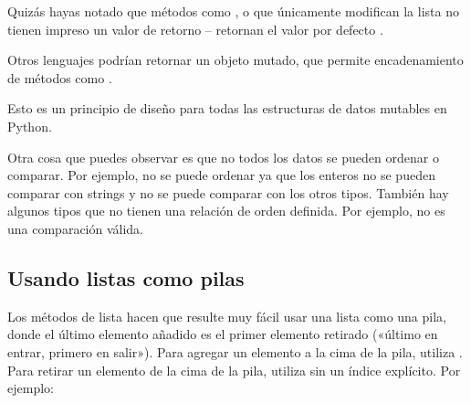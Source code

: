 \documentclass[a5paper,10pt,spanish]{sphinxmanual}
\begin{document}
\sphinxAtStartPar
Quizás hayas notado que métodos como ,  o  que únicamente modifican la lista no tienen impreso un valor de retorno – retornan el valor por defecto . \sphinxstepexplicit %
\begin{footnote}[1]\label{\thesphinxscope.1}%
\sphinxAtStartFootnote
Otros lenguajes podrían retornar un objeto mutado, que permite encadenamiento de métodos como .
%
\end{footnote} Esto es un principio de diseño para todas las estructuras de datos mutables en Python.

\sphinxAtStartPar
Otra cosa que puedes observar es que no todos los datos se pueden ordenar o comparar. Por ejemplo,  no se puede ordenar ya que los enteros no se pueden comparar con strings y  no se puede comparar con los otros tipos. También hay algunos tipos que no tienen una relación de orden definida. Por ejemplo,  no es una comparación válida.


\subsection{Usando listas como pilas}
\label{\detokenize{tutorial/datastructures:using-lists-as-stacks}}\label{\detokenize{tutorial/datastructures:tut-lists-as-stacks}}
\sphinxAtStartPar
Los métodos de lista hacen que resulte muy fácil usar una lista como una pila, donde el último elemento añadido es el primer elemento retirado («último en entrar, primero en salir»). Para agregar un elemento a la cima de la pila, utiliza . Para retirar un elemento de la cima de la pila, utiliza  sin un índice explícito. Por ejemplo:

\begin{sphinxVerbatim}[commandchars=\\\{\}]
  \PYG{p}{[}  \PYG{p}{]}
\end{sphinxVerbatim}
\end{document}
